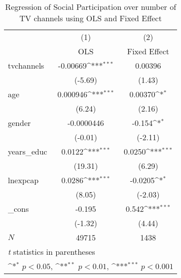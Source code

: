 \begin{table}[htbp]\centering
\def\sym#1{\ifmmode^{#1}\else\(^{#1}\)\fi}
\caption{ Regression of Social Participation over number of TV channels using OLS and Fixed Effect}
\begin{tabular}{l*{2}{c}}
\hline\hline
            &\multicolumn{1}{c}{(1)}&\multicolumn{1}{c}{(2)}\\
            &\multicolumn{1}{c}{OLS}&\multicolumn{1}{c}{Fixed Effect}\\
\hline
tvchannels  &    -0.00669\sym{***}&     0.00396         \\
            &     (-5.69)         &      (1.43)         \\
[1em]
age         &    0.000946\sym{***}&     0.00370\sym{*}  \\
            &      (6.24)         &      (2.16)         \\
[1em]
gender      &  -0.0000446         &      -0.154\sym{*}  \\
            &     (-0.01)         &     (-2.11)         \\
[1em]
years\_educ  &      0.0122\sym{***}&      0.0250\sym{***}\\
            &     (19.31)         &      (6.29)         \\
[1em]
lnexpcap    &      0.0286\sym{***}&     -0.0205\sym{*}  \\
            &      (8.05)         &     (-2.03)         \\
[1em]
\_cons      &      -0.195         &       0.542\sym{***}\\
            &     (-1.32)         &      (4.44)         \\
\hline
\(N\)       &       49715         &        1438         \\
\hline\hline
\multicolumn{3}{l}{\footnotesize \textit{t} statistics in parentheses}\\
\multicolumn{3}{l}{\footnotesize \sym{*} \(p<0.05\), \sym{**} \(p<0.01\), \sym{***} \(p<0.001\)}\\
\end{tabular}
\end{table}
